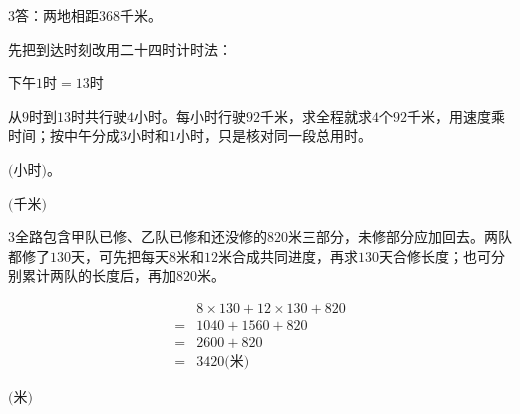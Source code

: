 \documentclass[multi=snippet,border={5bp 20bp 5bp 5bp}]{standalone}
\newenvironment{snippet}[3]{\begin{minipage}{#1bp}\color{answerred}\fontsize{#2}{#3}\selectfont\raggedright}{\end{minipage}}
\begin{document}
\begin{snippet}{505}{11.5}{14}\begin{multicols}{3}\raggedcolumns 答：两地相距368千米。\par 先把到达时刻改用二十四时计时法：\par\noindent\(\displaystyle \text{下午}1\text{时}=13\text{时}\)\allowbreak \par 从\(9\)\allowbreak 时到\(13\)\allowbreak 时共行驶\(4\)\allowbreak 小时。每小时行驶\(92\)\allowbreak 千米，求全程就求\(4\)\allowbreak 个\(92\)\allowbreak 千米，用速度乘时间；按中午分成\(3\)\allowbreak 小时和\(1\)\allowbreak 小时，只是核对同一段总用时。\end{multicols}\end{snippet}
\begin{snippet}{80}{10.0}{14}\SourceSans\setlength{\mathindent}{2bp}\(\text{(小时)。}\)\end{snippet}
\begin{snippet}{80}{10.0}{14}\SourceSans\setlength{\mathindent}{2bp}\(\text{(千米)}\)\end{snippet}
\begin{snippet}{505}{11.5}{14}\begin{multicols}{3}\raggedcolumns 全路包含甲队已修、乙队已修和还没修的\(820\)\allowbreak 米三部分，未修部分应加回去。两队都修了\(130\)\allowbreak 天，可先把每天\(8\)\allowbreak 米和\(12\)\allowbreak 米合成共同进度，再求\(130\)\allowbreak 天合修长度；也可分别累计两队的长度后，再加\(820\)\allowbreak 米。\par \[\begin{aligned}&8\times130+12\times130+820\\={}&1040+1560+820\\={}&2600+820\\={}&3420\text{(米)}\end{aligned}\]\end{multicols}\end{snippet}
\begin{snippet}{80}{10.0}{14}\SourceSans\setlength{\mathindent}{2bp}\(\text{(米)}\)\end{snippet}
\end{document}
